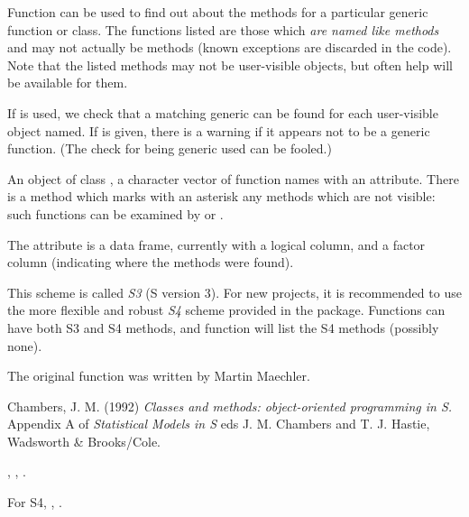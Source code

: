 %
\begin{Details}\relax
Function  can be used to find out about the methods for
a particular generic function or class.  The functions listed are those
which \emph{are named like methods} and may not actually be methods
(known exceptions are discarded in the code).  Note that the listed
methods may not be user-visible objects, but often help will be
available for them.

If  is used, we check that a matching generic can be found
for each user-visible object named.  If  is
given, there is a warning if it appears not to be a generic function.
(The check for being generic used can be fooled.)
\end{Details}
%
\begin{Value}
An object of class , a
character vector of function names with an  attribute.
There is a  method which marks with an asterisk any
methods which are not visible: such functions can be examined by
 or .

The  attribute is a data frame, currently with a
logical column,  and a factor column 
(indicating where the methods were found).
\end{Value}
%
\begin{Note}\relax
This scheme is called \emph{S3} (S version 3).  For new projects,
it is recommended to use the more flexible and robust \emph{S4} scheme
provided in the  package.  Functions can have both S3
and S4 methods, and function  will
list the S4 methods (possibly none).

The original  function was written by Martin Maechler.
\end{Note}
%
\begin{References}\relax
Chambers, J. M. (1992)
\emph{Classes and methods: object-oriented programming in S.}
Appendix A of \emph{Statistical Models in S}
eds J. M. Chambers and T. J. Hastie, Wadsworth \& Brooks/Cole.
\end{References}
%
\begin{SeeAlso}\relax
{}, , .

For S4, , .
\end{SeeAlso}
